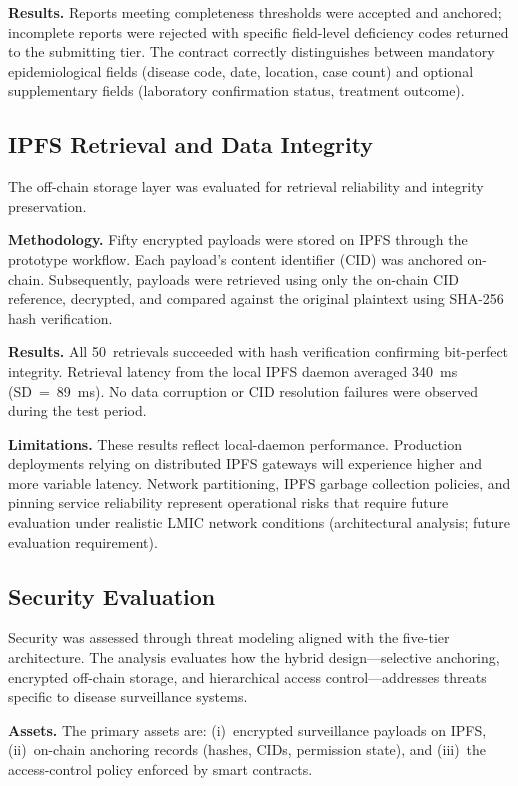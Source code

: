 \textbf{Results.} Reports meeting completeness thresholds were accepted and anchored; incomplete reports were rejected with specific field-level deficiency codes returned to the submitting tier. The contract correctly distinguishes between mandatory epidemiological fields (disease code, date, location, case count) and optional supplementary fields (laboratory confirmation status, treatment outcome).

\subsection{IPFS Retrieval and Data Integrity}\label{subsec:ipfs_eval}

The off-chain storage layer was evaluated for retrieval reliability and integrity preservation.

\textbf{Methodology.} Fifty encrypted payloads were stored on IPFS through the prototype workflow. Each payload's content identifier (CID) was anchored on-chain. Subsequently, payloads were retrieved using only the on-chain CID reference, decrypted, and compared against the original plaintext using SHA-256 hash verification.

\textbf{Results.} All 50~retrievals succeeded with hash verification confirming bit-perfect integrity. Retrieval latency from the local IPFS daemon averaged 340~ms (SD~=~89~ms). No data corruption or CID resolution failures were observed during the test period.

\textbf{Limitations.} These results reflect local-daemon performance. Production deployments relying on distributed IPFS gateways will experience higher and more variable latency. Network partitioning, IPFS garbage collection policies, and pinning service reliability represent operational risks that require future evaluation under realistic LMIC network conditions (architectural analysis; future evaluation requirement).

\subsection{Security Evaluation}\label{subsec:security}

Security was assessed through threat modeling aligned with the five-tier architecture. The analysis evaluates how the hybrid design---selective anchoring, encrypted off-chain storage, and hierarchical access control---addresses threats specific to disease surveillance systems.

\textbf{Assets.} The primary assets are: (i)~encrypted surveillance payloads on IPFS, (ii)~on-chain anchoring records (hashes, CIDs, permission state), and (iii)~the access-control policy enforced by smart contracts.

